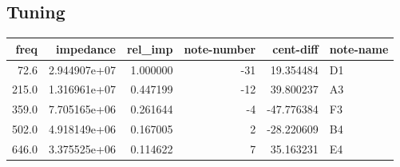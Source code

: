 \documentclass{article}
\begin{document}
\subsection{Tuning}
\begin{centering}
\begin{tabular}{rrrrrl}
\toprule
 freq &    impedance &  rel\_imp &  note-number &  cent-diff & note-name \\
\midrule
 72.6 & 2.944907e+07 & 1.000000 &          -31 &  19.354484 &        D1 \\
215.0 & 1.316961e+07 & 0.447199 &          -12 &  39.800237 &        A3 \\
359.0 & 7.705165e+06 & 0.261644 &           -4 & -47.776384 &        F3 \\
502.0 & 4.918149e+06 & 0.167005 &            2 & -28.220609 &        B4 \\
646.0 & 3.375525e+06 & 0.114622 &            7 &  35.163231 &        E4 \\
\bottomrule
\end{tabular}
\end{centering}
\end{document}

